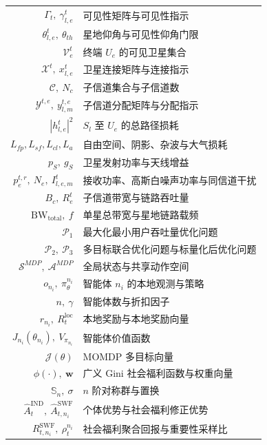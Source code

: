 \begin{nomenclature}
\begin{longtable}{rl}
  $\Gamma_t,\ \gamma_{l,e}^t$          & 可见性矩阵与可见性指示 \\
  $\theta_{l,e}^t,\ \theta_{th}$       & 星地仰角与可见性仰角门限 \\
  $\mathcal{V}_e^t$                    & 终端 $U_e$ 的可见卫星集合 \\
  $\mathcal{X}^t,\ x_{l,e}^t$          & 卫星连接矩阵与连接指示 \\
  $\mathcal{C},\ N_c$                  & 子信道集合与子信道数 \\
  $\mathcal{Y}^{t,e},\ y_{l,m}^{t,e}$  & 子信道分配矩阵与分配指示 \\
  $|h_{l,e}^t|^2$                      & $S_l$ 至 $U_e$ 的总路径损耗 \\
  $L_{fp},L_{sf},L_{cl},L_a$           & 自由空间、阴影、杂波与大气损耗 \\
  $p_S,\ g_S$                          & 卫星发射功率与天线增益 \\
  $p_e^{t,r},\ N_e,\ I_{l,e,m}^t$      & 接收功率、高斯白噪声功率与同信道干扰 \\
  $B_c,\ R_e^t$                        & 子信道带宽与链路吞吐量 \\
  $\mathrm{BW}_{\mathrm{total}},\ f$   & 单星总带宽与星地链路载频 \\
  $\mathcal{P}_1$                      & 最大化最小用户吞吐量优化问题 \\
  $\mathcal{P}_2,\ \mathcal{P}_3$      & 多目标联合优化问题与标量化后优化问题 \\
  $\mathcal{S}^{MDP},\ \mathcal{A}^{MDP}$ & 全局状态与共享动作空间 \\
  $o_{n_i},\ \pi_\theta^{n_i}$         & 智能体 $n_i$ 的本地观测与策略 \\
  $n,\ \gamma$                         & 智能体数与折扣因子 \\
  $r_{n_i},\ R_t^{\mathrm{loc}}$       & 本地奖励与本地奖励向量 \\
  $J_{n_i}(\theta_{n_i}),\ V_{\pi_{n_i}}$ & 智能体价值函数 \\
  $\mathcal{J}(\theta)$                & MOMDP 多目标向量 \\
  $\phi(\cdot),\ \mathbf{w}$           & 广义 Gini 社会福利函数与权重向量 \\
  $\mathbb{S}_n,\ \sigma$              & $n$ 阶对称群与置换 \\
  $\hat{A}_t^{\mathrm{IND}},\ \hat{A}_{t,n_i}^{\mathrm{SWF}}$ & 个体优势与社会福利修正优势 \\
  $R_{t,n_i}^{\mathrm{SWF}},\ \rho_t^{n_i}$ & 社会福利聚合回报与重要性采样比 \\

\end{longtable}
\end{nomenclature}
